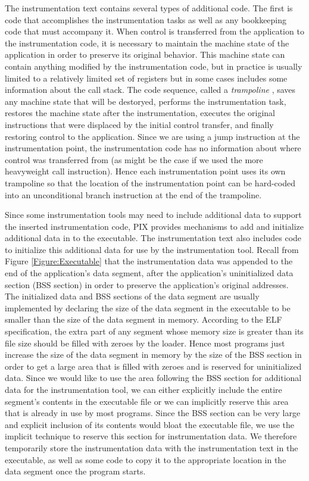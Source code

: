 The instrumentation text contains several types of additional code. The first
is code that accomplishes the instrumentation tasks as well as any bookkeeping code
that must accompany it. When control is transferred from the application to the
instrumentation code, it is necessary to maintain the machine state of
the application in order to preserve its original behavior. This machine state
can contain anything modified by the instrumentation code, but in practice is
usually limited to a relatively limited set of registers but in some cases includes
some information about the call stack. The code sequence, called a \textit{trampoline} \cite{buck2000api}, 
saves any machine state that will be destoryed, performs the instrumentation task, restores
the machine state after the instrumentation, executes the
original instructions that were displaced by the initial control transfer,
and finally restoring control to the application. Since we are using a jump instruction at the instrumentation point, the
instrumentation code has no information about where control was transferred from
(as might be the case if we used the more heavyweight call instruction). Hence
each instrumentation point uses its own trampoline so that the location of the
instrumentation point can be hard-coded into an unconditional branch instruction
at the end of the trampoline.

Since some instrumentation tools may need to include additional data to support the inserted instrumentation code,
PIX provides mechanisms to add and initialize additional data in to the executable.
The instrumentation text also includes code to initialize this additional data for use by the
instrumentation tool. Recall from Figure \ref{Figure:Executable} that the instrumentation
data was appended to the end of the application's data segment, after the
application's uninitialized data section (BSS section) in order to preserve the application's 
original addresses. The initialized data and BSS
sections of the data segment are usually implemented by declaring the size of
the data segment in the executable to be smaller than the size of the data
segment in memory. According to the ELF specification\cite{standard1995executable}, the extra part of any
segment whose memory size is greater than its file size should be filled with
zeroes by the loader. Hence most programs just increase the size of the data
segment in memory by the size of the BSS section in order to get a large
area that is filled with zeroes and is reserved for uninitialized data. Since we
would like to use the area following the BSS section for additional
data for the instrumentation tool, we can either explicitly include the entire
segment's contents in the executable file or we can implicitly reserve this area
that is already in use by most programs.
Since the BSS section can be very large and explicit inclusion of its contents
would bloat the  executable file, we use the implicit
technique to reserve this section for instrumentation data. We therefore
temporarily store the instrumentation data with the instrumentation text in the
executable, as well as some code to copy it to the appropriate location in the
data segment once the program starts.
